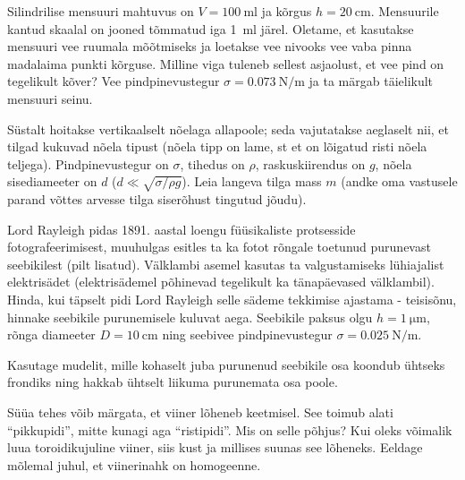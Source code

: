 \documentclass[a4paper,11pt,twocolumn]{article}
\begin{document}
\begin{question}
	Silindrilise mensuuri mahtuvus on \( V = \SI{100}{\ml} \) ja kõrgus \( h = \SI{20}{\cm} \). Mensuurile kantud skaalal on jooned tõmmatud iga \SI{1}{\ml} järel. Oletame, et kasutakse mensuuri vee ruumala mõõtmiseks ja loetakse vee nivooks vee vaba pinna madalaima punkti kõrguse. Milline viga tuleneb sellest asjaolust, et vee pind on tegelikult kõver? Vee pindpinevustegur \( \sigma = \SI{0,073}{\N\per\m} \) ja ta märgab täielikult mensuuri seinu.
\end{question}
\begin{question}
	Süstalt hoitakse vertikaalselt nõelaga allapoole; seda vajutatakse aeglaselt nii, et tilgad kukuvad nõela tipust (nõela tipp on lame, st et on lõigatud risti nõela teljega). Pindpinevustegur on \( \sigma \), tihedus on \( \rho \), raskuskiirendus on \( g \), nõela sisediameeter on \( d \) (\( d \ll \sqrt{\sigma/\rho g} \)). Leia langeva tilga mass \( m \) (andke oma vastusele parand võttes arvesse tilga siserõhust tingutud jõudu).
\end{question}

\begin{question}[E-S 2009, P6][ter5][5cm]
	Lord Rayleigh pidas 1891. aastal loengu füüsikaliste protsesside fotografeerimisest, muuhulgas esitles ta ka fotot rõngale toetunud purunevast seebikilest (pilt lisatud). Välklambi asemel kasutas ta valgustamiseks lühiajalist elektrisädet (elektrisädemel põhinevad tegelikult ka tänapäevased välklambil). Hinda, kui täpselt pidi Lord Rayleigh selle sädeme tekkimise ajastama - teisisõnu, hinnake seebikile purunemisele kuluvat aega. Seebikile paksus olgu \( h = \SI{1}{\micro\m} \), rõnga diameeter \( D = \SI{10}{\cm} \) ning seebivee pindpinevustegur \( \sigma = \SI{0.025}{\N\per\m} \).\\
	\begin{hint}
		Kasutage mudelit, mille kohaselt juba purunenud seebikile osa koondub ühtseks frondiks ning hakkab ühtselt liikuma purunemata osa poole.
	\end{hint}
\end{question}

\begin{question}[200MPPP, P67][ter6][\columnwidth]
	Süüa tehes võib märgata, et viiner lõheneb keetmisel. See toimub alati \enquote{pikkupidi}, mitte kunagi aga \enquote{ristipidi}. Mis on selle põhjus? Kui oleks võimalik luua toroidikujuline viiner, siis kust ja millises suunas see lõheneks. Eeldage mõlemal juhul, et viinerinahk on homogeenne.
\end{question}
\end{document}
